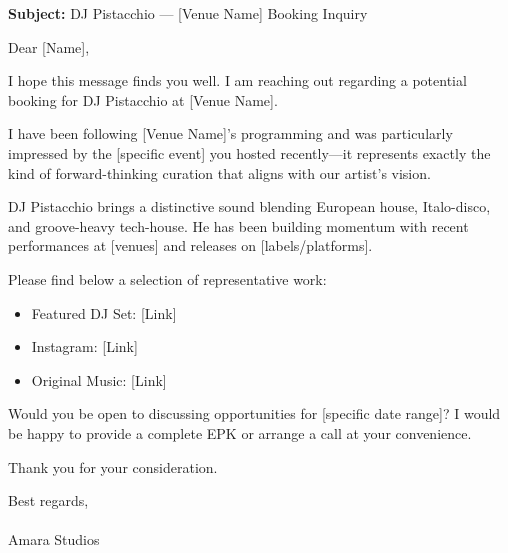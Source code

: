 \documentclass[11pt,a4paper]{article}
\begin{document}
\begin{highlightbox}
\small
\textbf{Subject:} DJ Pistacchio --- [Venue Name] Booking Inquiry

\vspace{0.5em}

Dear [Name],

\vspace{0.5em}

I hope this message finds you well. I am reaching out regarding a potential booking for DJ Pistacchio at [Venue Name].

\vspace{0.5em}

I have been following [Venue Name]'s programming and was particularly impressed by the [specific event] you hosted recently---it represents exactly the kind of forward-thinking curation that aligns with our artist's vision.

\vspace{0.5em}

DJ Pistacchio brings a distinctive sound blending European house, Italo-disco, and groove-heavy tech-house. He has been building momentum with recent performances at [venues] and releases on [labels/platforms].

\vspace{0.5em}

Please find below a selection of representative work:
\begin{itemize}[leftmargin=*,topsep=0pt]
    \item Featured DJ Set: [Link]
    \item Instagram: [Link]
    \item Original Music: [Link]
\end{itemize}

\vspace{0.5em}

Would you be open to discussing opportunities for [specific date range]? I would be happy to provide a complete EPK or arrange a call at your convenience.

\vspace{0.5em}

Thank you for your consideration.

\vspace{0.5em}

Best regards,\\
[Name]\\
Amara Studios
\end{highlightbox}
\end{document}
